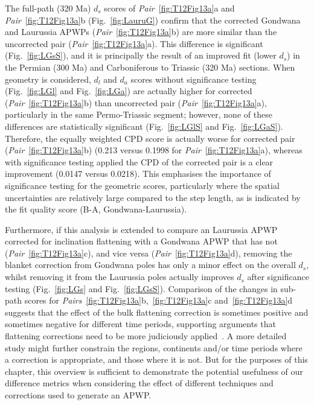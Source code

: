 The full-path (320 Ma) $d_s$ scores of
\emph{Pair}~\ref{fig:T12Fig13a}a and \emph{Pair}~\ref{fig:T12Fig13a}b
(Fig.~\ref{fig:LauruG}) confirm that the corrected Gondwana and Laurussia
APWPs (\emph{Pair}~\ref{fig:T12Fig13a}b) are more similar than the uncorrected
pair (\emph{Pair}~\ref{fig:T12Fig13a}a). This difference is significant
(Fig.~\ref{fig:LGsS}), and it is principally the result of an improved fit
(lower $d_s$) in the Permian (300 Ma) and Carboniferous to
Triassic (320 Ma) sections. When geometry is considered, $d_l$
and $d_a$ scores without significance testing (Fig.~\ref{fig:LGl} and
Fig.~\ref{fig:LGa}) are actually higher for corrected
(\emph{Pair}~\ref{fig:T12Fig13a}b) than uncorrected pair
(\emph{Pair}~\ref{fig:T12Fig13a}a), particularly in the same Permo-Triassic
segment; however, none of these differences are statistically significant
(Fig.~\ref{fig:LGlS} and Fig.~\ref{fig:LGaS}). Therefore, the equally weighted
CPD score is actually worse for corrected pair
(\emph{Pair}~\ref{fig:T12Fig13a}b) (0.213 versus 0.1998 for
\emph{Pair}~\ref{fig:T12Fig13a}a), whereas with significance testing applied the
CPD of the corrected pair is a clear improvement (0.0147 versus 0.0218). This
emphasises the importance of significance testing for the geometric scores,
particularly where the spatial uncertainties are relatively large compared to
the step length, as is indicated by the fit quality score (B-A,
Gondwana-Laurussia).

Furthermore, if this analysis is extended to compare an Laurussia APWP corrected
for inclination flattening with a Gondwana APWP that has not
(\emph{Pair}~\ref{fig:T12Fig13a}c), and vice versa
(\emph{Pair}~\ref{fig:T12Fig13a}d), removing the blanket correction from
Gondwana poles has only a minor effect on the overall $d_s$, whilst removing it
from the Laurussia poles actually improves $d_s$ after significance testing
(Fig.~\ref{fig:LGs} and Fig.~\ref{fig:LGsS}). Comparison of the changes in
sub-path scores for \emph{Pairs}~\ref{fig:T12Fig13a}b,~\ref{fig:T12Fig13a}c
and~\ref{fig:T12Fig13a}d suggests that the effect of the bulk flattening
correction is sometimes positive and sometimes negative for different time
periods, supporting arguments that flattening corrections need to be more
judiciously applied~\cite[for example]{B10,B16}. A more detailed study might
further constrain the regions, continents and/or time periods where a correction
is appropriate, and those where it is not. But for the purposes of this chapter,
this overview is sufficient to demonstrate the potential usefulness of our
difference metrics when considering the effect of different techniques and
corrections used to generate an APWP\@.

